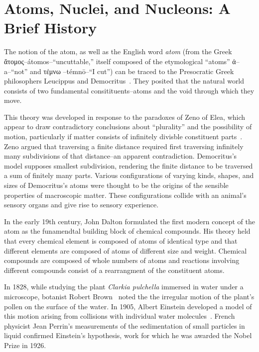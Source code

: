 \section{Atoms, Nuclei, and Nucleons: A Brief History}

The notion of the atom, as well as the English word \textit{atom}
(from the Greek \textgreek{ἄτομος}--átomos--``uncuttable,''
itself composed of the etymological ``atoms''
\textgreek{ἀ}--a--``not''
and
\textgreek{τέμνω }--témnō--``I cut'') can be traced to the Presocratic Greek
philosophers Leucippus and Democritus~\cite{sep-atomism-ancient}.
They posited that the natural world consists of two fundamental
consitituents--atoms and the void through which they move.


This theory was developed in response to the paradoxes of Zeno of
Elea, which appear to draw contradictory conclusions about ``plurality'' and
the possibility of motion, particularly if matter consists of infinitely divisble
constituent parts~\cite{sep-paradox-zeno}.
Zeno argued that traversing a finite distance required first traversing
infinitely many subdivisions of that distance--an apparent contradiction.
Democritus's model supposes smallest subdivision, rendering the finite distance
to be traversed a sum of finitely many parts.
Various configurations of varying kinds, shapes, and sizes of Democritus's
atoms were thought to be the origins of the sensible properties of macroscopic
matter.
These configurations collide with an animal's sensory organs and give rise to
sensory experience.


In the early 19th century, John Dalton formulated the first modern concept of
the atom as the funamendtal building block of chemical compounds.
His theory held that every chemical element is composed of atoms of identical
type and that different elements are composed of atoms of different size and
weight.
Chemical compounds are composed of whole numbers of atoms and reactions
involving different compounds consist of a rearrangment of the constituent
atoms.


In 1828, while studying the plant \textit{Clarkia pulchella} immersed in water
under a microscope,
botanist Robert Brown~\cite{Brown_1828} noted the
the irregular motion of the plant's pollen on the surface of the water.
In 1905, Albert Einstein developed a model of this motion  arising from
collisions with individual water molecules~\cite{Einstein_1905}.
French physicist Jean Perrin's measurements of the sedimentation of small
particles in liquid confirmed Einstein's hypothesis, work for which he was
awarded the Nobel Prize in 1926.

